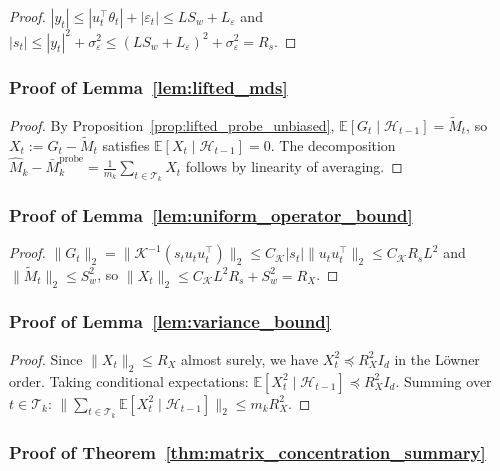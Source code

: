 \documentclass{article}
\newcommand{\E}{\mathbb{E}}
\newcommand{\cH}{\mathcal{H}}
\newcommand{\cT}{\mathcal{T}}
\begin{document}
\begin{proof}
$|y_t| \le |u_t^\top \theta_t| + |\varepsilon_t| \le LS_w + L_\varepsilon$ and $|s_t| \le |y_t|^2 + \sigma_\varepsilon^2 \le (LS_w + L_\varepsilon)^2 + \sigma_\varepsilon^2 = R_s$.
\end{proof}

\subsubsection{Proof of Lemma~\ref{lem:lifted_mds}}
\label{proof:lifted_mds}

\begin{proof}
By Proposition~\ref{prop:lifted_probe_unbiased}, $\E[G_t \mid \cH_{t-1}] = \widetilde{M}_t$, so $X_t := G_t - \widetilde{M}_t$ satisfies $\E[X_t \mid \cH_{t-1}] = 0$.
The decomposition $\widehat{M}_k - \bar{M}_k^{\mathrm{probe}} = \frac{1}{m_k}\sum_{t \in \cT_k} X_t$ follows by linearity of averaging.
\end{proof}

\subsubsection{Proof of Lemma~\ref{lem:uniform_operator_bound}}
\label{proof:uniform_operator_bound}

\begin{proof}
$\|G_t\|_2 = \|\mathcal K^{-1}(s_t u_t u_t^\top)\|_2 \le C_{\mathcal K} |s_t| \|u_t u_t^\top\|_2 \le C_{\mathcal K} R_s L^2$ and $\|\widetilde{M}_t\|_2 \le S_w^2$, so $\|X_t\|_2 \le C_{\mathcal K} L^2 R_s + S_w^2 = R_X$.
\end{proof}

\subsubsection{Proof of Lemma~\ref{lem:variance_bound}}
\label{proof:variance_bound}

\begin{proof}
Since $\|X_t\|_2 \le R_X$ almost surely, we have $X_t^2 \preceq R_X^2 I_d$ in the L\"owner order.
Taking conditional expectations: $\E[X_t^2 \mid \cH_{t-1}] \preceq R_X^2 I_d$.
Summing over $t \in \cT_k$: $\|\sum_{t \in \cT_k} \E[X_t^2 \mid \cH_{t-1}]\|_2 \le m_k R_X^2$.
\end{proof}

\subsubsection{Proof of Theorem~\ref{thm:matrix_concentration_summary}}
\label{proof:matrix_concentration}
\end{document}
